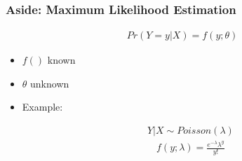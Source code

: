 \documentclass[
  shownotes,
  xcolor={svgnames},
  hyperref={colorlinks,citecolor=DarkBlue,linkcolor=andesred,urlcolor=DarkBlue}
  , aspectratio=169]{beamer}
\begin{document}
\begin{frame}[fragile]
\frametitle{Aside: Maximum Likelihood Estimation}

\begin{align}
Pr(Y=y|X) = f(y;\theta)
\end{align}
\begin{itemize}
\item $f()$ known
\medskip
\item $\theta$ unknown
\medskip
\item Example:

\begin{align}
Y|X \sim Poisson(\lambda)
\end{align}
\begin{align}
f(y;\lambda) = \frac{e^{-\lambda} \lambda^y}{y!} 
\end{align}
\end{itemize}



\end{frame}
\end{document}
